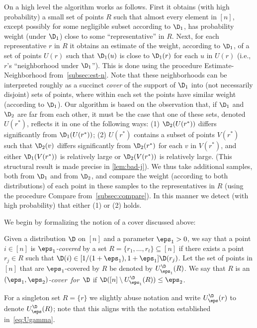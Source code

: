 On a high level the algorithm works as follows. First it obtains
(with high probability) a small set of points $R$ such that
almost every element in $[n]$, except possibly for some negligible
subset according to $\D_1$, has probability weight (under $\D_1$)
close to some ``representative'' in $R$.
Next, for each representative $r$ in $R$
 it obtains an estimate of the weight, according
to $\D_1$, of a set of points $U(r)$ such that $\D_1(u)$
is close to $\D_1(r)$ for each $u$ in $U(r)$
(i.e., $r$'s ``neighborhood under $\D_1$'').
This is done using the procedure
{\sc Estimate-Neighborhood} from~\cref{subsec:est-n}.
Note that these neighborhoods can be interpreted roughly as a succinct \emph{cover} of the support of $\D_1$ into
(not necessarily disjoint) sets of
points, where within each set the points have similar
weight (according to $\D_1$). Our algorithm is based on the observation that,
if $\D_1$ and $\D_2$ are far from each other, it must be the case
that one of these sets, denoted $U(r^\ast)$, reflects it
in one of the following ways: (1) $\D_2(U(r^\ast))$ differs
significantly from $\D_1(U(r^\ast))$; (2) $U(r^\ast)$ contains
a subset of points $V(r^\ast)$ such that $\D_2(v)$ differs
significantly from $\D_2(r^\ast)$ for each $v$ in $V(r^\ast)$, and
either $\D_1(V(r^\ast))$ is relatively large or
$\D_2(V(r^\ast))$ is relatively large. (This structural result is made precise in
\cref{lem:bad-j}). We thus take additional samples, both
from $\D_1$ and from $\D_2$, and compare the weight
(according to both distributions)
of each point in these samples to the representatives in $R$
(using the procedure
{\sc Compare} from~\cref{subsec:compare}). In this manner we detect (with high probability) that either
(1) or (2) holds.

\noindent We begin by formalizing the notion of a cover discussed above:

\begin{definition}
Given a distribution $\D$ on $[n]$ and a parameter $\eps_1>0$,
we say that a point $i \in [n]$ is
{\em $\eps_1$-covered\/} by a set $R = \{r_1,\dots,r_t\}\subseteq [n]$ if
there exists a point $r_j \in R$ such that
$\D(i) \in [1/(1+\eps_1), 1+\eps_1]\D(r_j)$.
Let the set of points in $[n]$ that are $\eps_1$-covered
by $R$ be denoted by $U^\D_{\eps_1}(R)$.
We say that $R$ is an
\mbox{\emph{$(\eps_1,\eps_2)$-cover for $\D$}}
if $\D([n]\setminus U_{\eps_1}^\D(R)) \leq \eps_2$.
\end{definition}

For a singleton set $R=\{r\}$ we slightly abuse notation and write
$U^\D_\eps(r)$ to denote $U^\D_\eps(R)$; note that this aligns
with the notation established in~\eqref{eq:Ugamma}.

